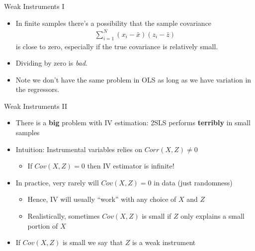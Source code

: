 \documentclass[aspectratio=169,11pt]{beamer}
\begin{document}
\begin{frame}{Weak Instruments I}
\begin{itemize}
	\item In finite samples there's a possibility that the sample covariance
	\begin{align*}
	\sum\limits_{i=1}^N(x_i-\bar{x})(z_i-\bar{z})
	\end{align*}
	is close to zero, especially if the true covariance is relatively small.
	\medskip
	\item Dividing by zero is \emph{bad}.
	\medskip
	\item Note we don't have the same problem in OLS as long as we have variation in the regressors.

\end{itemize}
\end{frame}



\begin{frame}{Weak Instruments II}
\begin{itemize}
\item There is a \textbf{big} problem with IV estimation: 2SLS performs \textbf{terribly} in small samples
\medskip
	\item Intuition: Instrumental variables relies on $Corr(X,Z)\ne 0$
		\begin{itemize}
			\item If $Cov(X,Z)=0$ then IV estimator is infinite!
		\end{itemize}
\medskip
	\item In practice, very rarely will $Cov(X,Z)=0$ in data (just randomness)
		\begin{itemize}
			\item Hence, IV will usually ``work'' with any choice of $X$ and $Z$
			\item Realistically, sometimes  $Cov(X,Z)$ is small if $Z$ only explains a small portion of $X$
		\end{itemize}
\medskip
	\item If $Cov(X,Z)$ is small we say that $Z$ is a weak instrument

\end{itemize}
\end{frame}
\end{document}
